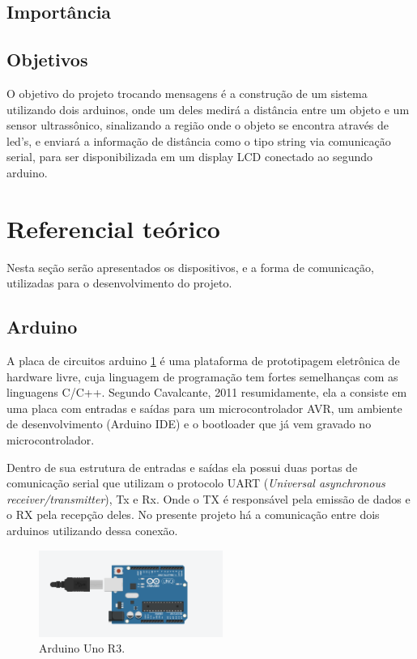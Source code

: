 \documentclass[conference]{IEEEtran}
\begin{document}
\subsection{Importância}

\subsection{Objetivos}
O objetivo do projeto trocando mensagens é a construção de um sistema utilizando dois arduinos,
onde um deles medirá a distância entre um objeto e um sensor ultrassônico, sinalizando a região onde o objeto se encontra através de led's,
e enviará a informação de distância como o tipo string via comunicação serial, para ser disponibilizada em um display LCD conectado ao segundo arduino.

\section{Referencial teórico}
Nesta seção serão apresentados os dispositivos, e a forma de comunicação, utilizadas para o desenvolvimento do projeto.

\subsection{Arduino}
A placa de circuitos arduino \ref{fig:arduino} é uma plataforma de prototipagem eletrônica de hardware livre, cuja linguagem de programação tem fortes semelhanças com
as linguagens C/C++. Segundo Cavalcante, 2011 \cite{cavalcante2011} resumidamente, ela a consiste em uma placa com entradas e saídas para um microcontrolador AVR, um 
ambiente de desenvolvimento (Arduino IDE) e o bootloader que já vem gravado no microcontrolador. 

Dentro de sua estrutura de entradas e saídas ela possui duas portas de comunicação serial que utilizam o protocolo UART (\textit{Universal asynchronous receiver/transmitter}), 
Tx e Rx. Onde o TX é responsável pela emissão de dados e o RX pela recepção deles. No presente projeto há a comunicação entre dois arduinos utilizando dessa conexão.

\begin{figure}[htbp]
    \centerline{
        \includegraphics[width=6cm]{images/arduino.png}
    }
    \caption{Arduino Uno R3.}
    \label{fig:arduino}
\end{figure}
\end{document}
